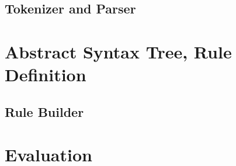 \section{Tokenizer and Parser}

\chapter{Abstract Syntax Tree, Rule Definition}


\section{Rule Builder}





\chapter{Evaluation}


